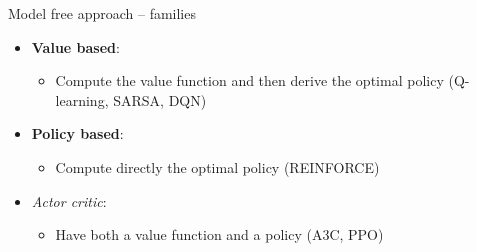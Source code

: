 \documentclass[presentation, 9pt]{beamer}\mode<presentation>{\usetheme{AMSBolognaFC}}
\begin{document}
\begin{frame}{Model free approach -- families}
	\begin{itemize}
		\item \textbf{Value based}:
		\begin{itemize}
			\item Compute the value function and then derive the optimal policy (Q-learning, SARSA, DQN)
		\end{itemize}
		\item \textbf{Policy based}:
		\begin{itemize}
			\item Compute directly the optimal policy (REINFORCE)
		\end{itemize}
		\item \emph{Actor critic}:
		\begin{itemize}
			\item Have both a value function and a policy (A3C, PPO)
		\end{itemize}
	\end{itemize}
\end{frame}
\end{document}
